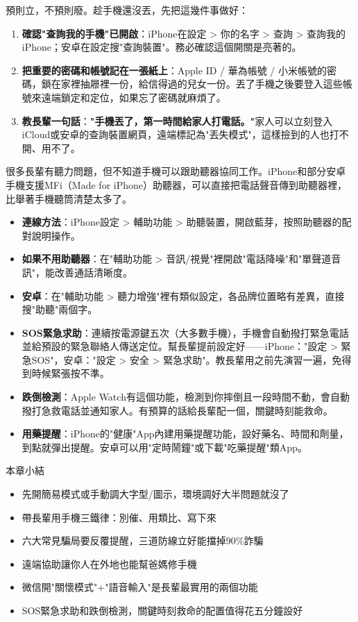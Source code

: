
預則立，不預則廢。趁手機還沒丟，先把這幾件事做好：

\begin{enumerate}
  \item \textbf{確認"查詢我的手機"已開啟}：iPhone在設定 > 你的名字 > 查詢 > 查詢我的iPhone；安卓在設定搜"查詢裝置"。務必確認這個開關是亮著的。
  \item \textbf{把重要的密碼和帳號記在一張紙上}：Apple ID / 華為帳號 / 小米帳號的密碼，鎖在家裡抽屜裡一份，給信得過的兒女一份。丟了手機之後要登入這些帳號來遠端鎖定和定位，如果忘了密碼就麻煩了。
  \item \textbf{教長輩一句話}：\textbf{"手機丟了，第一時間給家人打電話。"}家人可以立刻登入iCloud或安卓的查詢裝置網頁，遠端標記為"丟失模式"，這樣撿到的人也打不開、用不了。
\end{enumerate}


很多長輩有聽力問題，但不知道手機可以跟助聽器協同工作。iPhone和部分安卓手機支援MFi（Made for iPhone）助聽器，可以直接把電話聲音傳到助聽器裡，比舉著手機聽筒清楚太多了。

\begin{itemize}
  \item \textbf{連線方法}：iPhone設定 > 輔助功能 > 助聽裝置，開啟藍芽，按照助聽器的配對說明操作。
  \item \textbf{如果不用助聽器}：在"輔助功能 > 音訊/視覺"裡開啟"電話降噪"和"單聲道音訊"，能改善通話清晰度。
  \item \textbf{安卓}：在"輔助功能 > 聽力增強"裡有類似設定，各品牌位置略有差異，直接搜"助聽"兩個字。
\end{itemize}


\begin{itemize}
  \item \textbf{SOS緊急求助}：連續按電源鍵五次（大多數手機），手機會自動撥打緊急電話並給預設的緊急聯絡人傳送定位。幫長輩提前設定好——iPhone："設定 > 緊急SOS"，安卓："設定 > 安全 > 緊急求助"。教長輩用之前先演習一遍，免得到時候緊張按不準。
  \item \textbf{跌倒檢測}：Apple Watch有這個功能，檢測到你摔倒且一段時間不動，會自動撥打急救電話並通知家人。有預算的話給長輩配一個，關鍵時刻能救命。
  \item \textbf{用藥提醒}：iPhone的"健康"App內建用藥提醒功能，設好藥名、時間和劑量，到點就彈出提醒。安卓可以用"定時鬧鐘"或下載"吃藥提醒"類App。
\end{itemize}

\begin{tcbsummary}{本章小結}
\begin{itemize}
  \item 先開簡易模式或手動調大字型/圖示，環境調好大半問題就沒了
  \item 帶長輩用手機三鐵律：別催、用類比、寫下來
  \item 六大常見騙局要反覆提醒，三道防線立好能擋掉90\%詐騙
  \item 遠端協助讓你人在外地也能幫爸媽修手機
  \item 微信開"關懷模式"+"語音輸入"是長輩最實用的兩個功能
  \item SOS緊急求助和跌倒檢測，關鍵時刻救命的配置值得花五分鐘設好
\end{itemize}

\end{tcbsummary}

